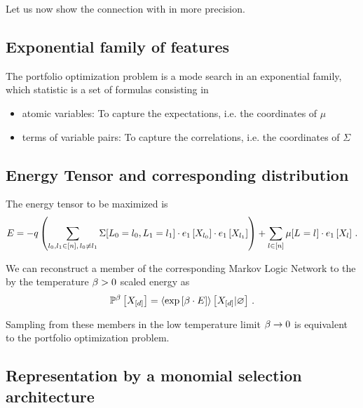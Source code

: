 \documentclass[aps,onecolumn,nofootinbib,pra]{article}
\begin{document}
Let us now show the connection with \tnreason in more precision.

\subsection{Exponential family of features}

The portfolio optimization problem is a mode search in an exponential family, which statistic is a set of formulas consisting in 
\begin{itemize}
	\item atomic variables: To capture the expectations, i.e. the coordinates of $\mu$
	\item terms of variable pairs: To capture the correlations, i.e. the coordinates of $\Sigma$
\end{itemize}

\subsection{Energy Tensor and corresponding distribution}

The energy tensor to be maximized is
	\[ E = - q \left(\sum_{l_{0},l_{1}\in[n] , \, l_{0}\neq l_{1}} 
	\Sigma[L_{0}=l_{0},L_{1}=l_{1}] \cdot e_{1}\left[X_{l_{0}}\right]\cdot e_{1}\left[X_{l_{1}}\right]\right) 
	+ \sum_{l\in[n]} \mu[L_{}=l_{}] \cdot e_{1}\left[X_{l}\right] \, . \]

We can reconstruct a member of the corresponding Markov Logic Network to the by the temperature $\beta>0$ scaled energy as
\begin{align*}
	\mathbb{P}^{\beta}\left[X_{[d]}\right] = \left\langle \mathrm{exp}\left[\beta\cdot E\right]\right\rangle \left[ X_{[d]} | \varnothing \right] \, . 
\end{align*}

Sampling from these members in the low temperature limit $\beta\rightarrow 0$ is equivalent to the portfolio optimization problem.

\subsection{Representation by a monomial selection architecture}
\end{document}
